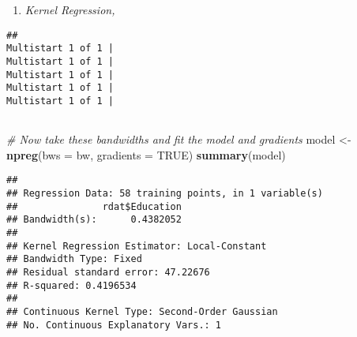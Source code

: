 \documentclass[]{article}
\newenvironment{Shaded}{\begin{snugshade}}{\end{snugshade}}
\newcommand{\KeywordTok}[1]{\textcolor[rgb]{0.13,0.29,0.53}{\textbf{#1}}}
\newcommand{\DataTypeTok}[1]{\textcolor[rgb]{0.13,0.29,0.53}{#1}}
\newcommand{\DecValTok}[1]{\textcolor[rgb]{0.00,0.00,0.81}{#1}}
\newcommand{\StringTok}[1]{\textcolor[rgb]{0.31,0.60,0.02}{#1}}
\newcommand{\CommentTok}[1]{\textcolor[rgb]{0.56,0.35,0.01}{\textit{#1}}}
\newcommand{\OtherTok}[1]{\textcolor[rgb]{0.56,0.35,0.01}{#1}}
\newcommand{\OperatorTok}[1]{\textcolor[rgb]{0.81,0.36,0.00}{\textbf{#1}}}
\newcommand{\NormalTok}[1]{#1}
\providecommand{\tightlist}{%
  \setlength{\itemsep}{0pt}\setlength{\parskip}{0pt}}
\begin{document}
\begin{enumerate}
\def\labelenumi{\arabic{enumi})}
\tightlist
\item
  \emph{Kernel Regression,}
\end{enumerate}

\begin{Shaded}
\end{Shaded}

\begin{verbatim}
## 
Multistart 1 of 1 |
Multistart 1 of 1 |
Multistart 1 of 1 |
Multistart 1 of 1 |
Multistart 1 of 1 |
                   
\end{verbatim}

\begin{Shaded}
\begin{Highlighting}[]
\CommentTok{# Now take these bandwidths and fit the model and gradients}
\NormalTok{model <-}\StringTok{ }\KeywordTok{npreg}\NormalTok{(}\DataTypeTok{bws =}\NormalTok{ bw, }\DataTypeTok{gradients =} \OtherTok{TRUE}\NormalTok{)}
\KeywordTok{summary}\NormalTok{(model)}
\end{Highlighting}
\end{Shaded}

\begin{verbatim}
## 
## Regression Data: 58 training points, in 1 variable(s)
##               rdat$Education
## Bandwidth(s):      0.4382052
## 
## Kernel Regression Estimator: Local-Constant
## Bandwidth Type: Fixed
## Residual standard error: 47.22676
## R-squared: 0.4196534
## 
## Continuous Kernel Type: Second-Order Gaussian
## No. Continuous Explanatory Vars.: 1
\end{verbatim}

\begin{Shaded}
\end{Shaded}
\end{document}
